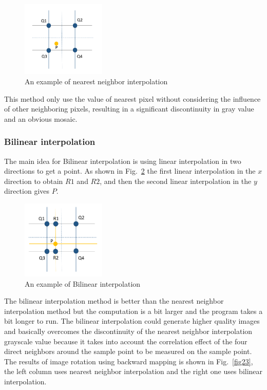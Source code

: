 \documentclass[hyperref]{article}
\theoremstyle{nonumberplain}
\begin{document}
	\begin{figure}[htbp]
		\centering
		\includegraphics[width=4cm]{nni.png}
		\caption{An example of nearest neighbor interpolation}
		\label{fig21}
	\end{figure}

	This method only use the value of nearest pixel without considering the influence of other neighboring pixels, resulting in a significant discontinuity in gray value and an obvious mosaic.
	
	\subsubsection{Bilinear interpolation}
	
	\hspace{1.0em}
	The main idea for Bilinear interpolation is using linear interpolation in two directions to get a point. As shown in Fig.~\ref{fig22} the first linear interpolation in the $x$ direction to obtain $R1$ and $R2$, and then the second linear interpolation in the $y$ direction gives $P$.
	
	\begin{figure}[htbp]
		\centering
		\includegraphics[width=4cm]{bi.png}
		\caption{An example of Bilinear interpolation}
		\label{fig22}
	\end{figure}

	The bilinear interpolation method is better than the nearest neighbor interpolation method but the computation is a bit larger and the program takes a bit longer to run. The bilinear interpolation could generate higher quality images and basically overcomes the discontinuity of the nearest neighbor interpolation grayscale value because it takes into account the correlation effect of the four direct neighbors around the sample point to be measured on the sample point. The results of image rotation using backward mapping is shown in Fig.~\ref{fig23}, the left column uses nearest neighbor interpolation and the right one uses bilinear interpolation.
	
\end{document}
